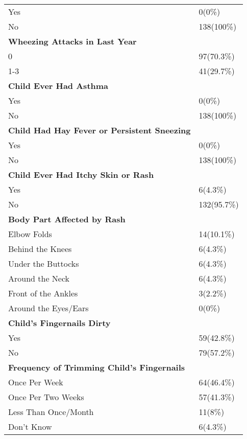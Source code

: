 \documentclass[10pt,letterpaper]{article}
\begin{document}
\begin{longtable}{ll}
Yes & 0(0\%) \\
No & 138(100\%) \\
\midrule
\textbf{Wheezing Attacks in Last Year} & \\
0 & 97(70.3\%) \\
1-3 & 41(29.7\%) \\
\midrule
\textbf{Child Ever Had Asthma} & \\
Yes & 0(0\%) \\
No & 138(100\%) \\
\midrule
\textbf{Child Had Hay Fever or Persistent Sneezing} & \\
Yes & 0(0\%) \\
No & 138(100\%) \\
\midrule
\textbf{Child Ever Had Itchy Skin or Rash} & \\
Yes & 6(4.3\%) \\
No & 132(95.7\%) \\
\midrule
\textbf{Body Part Affected by Rash} & \\
Elbow Folds & 14(10.1\%) \\
Behind the Knees & 6(4.3\%) \\
Under the Buttocks & 6(4.3\%) \\
Around the Neck & 6(4.3\%) \\
Front of the Ankles & 3(2.2\%) \\
Around the Eyes/Ears & 0(0\%) \\
\midrule
\textbf{Child's Fingernails Dirty} & \\
Yes & 59(42.8\%) \\
No & 79(57.2\%) \\
\midrule
\textbf{Frequency of Trimming Child's Fingernails} & \\
Once Per Week & 64(46.4\%) \\
Once Per Two Weeks & 57(41.3\%) \\
Less Than Once/Month & 11(8\%) \\
Don't Know & 6(4.3\%) \\
\bottomrule
\end{longtable}
\end{document}
